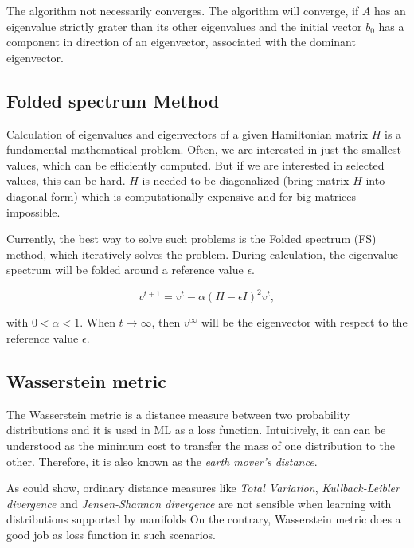 The algorithm not necessarily converges. The algorithm will converge, if $A$ has an eigenvalue strictly grater than its other eigenvalues
and the initial vector $b_0$ has a component in direction of an eigenvector, associated with the dominant eigenvector.

\subsection{Folded spectrum Method}
\label{sec:FoldedSpectrumMethod}
Calculation of eigenvalues and eigenvectors of a given Hamiltonian matrix $H$ 
is a fundamental mathematical problem. Often, we are interested in just the smallest 
values, which can be efficiently computed. But if we are interested in selected values,
this can be hard. $H$ is needed to be diagonalized (bring matrix $H$ into diagonal form) 
which is computationally expensive and for big matrices impossible.

Currently, the best way to solve such problems is the Folded spectrum (FS)\cite{foldedSpectrumMethod} method,
which iteratively solves the problem. During calculation, the eigenvalue spectrum will be folded around a reference 
value $\epsilon$.

\begin{equation}
    \label{eq:foldedSpectrumMethod}
    v^{t+1} = v^t - \alpha (H - \epsilon I )^2 v^t ,
\end{equation}

with $0 < \alpha < 1$. When $t \rightarrow \infty$, then $v^{\infty}$ will be the 
eigenvector with respect to the reference value $\epsilon$.


\subsection{Wasserstein metric}

The Wasserstein metric is a distance measure between two probability distributions and it is used in ML as a loss function\cite{learningWithWasserstein}. 
Intuitively, it can can be understood as the minimum cost to transfer the mass of one distribution to the other.
Therefore, it is also known as the \textit{earth mover's distance}.

As \citet{wassersteinGAN} could show, ordinary distance measures like \textit{Total Variation}, \textit{Kullback-Leibler divergence}
and \textit{Jensen-Shannon divergence} are not sensible when learning with distributions supported by manifolds
On the contrary, Wasserstein metric does a good job as loss function in such scenarios.


